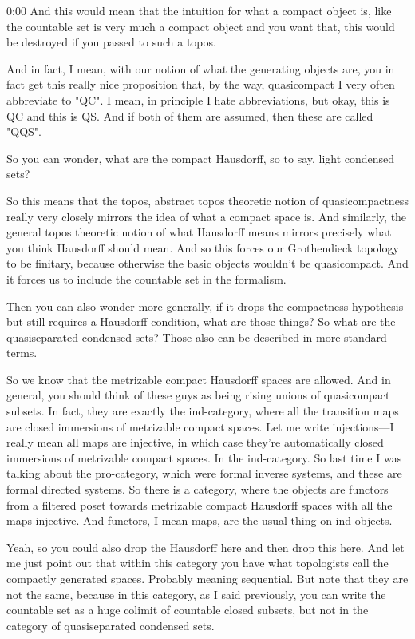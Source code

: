 \begin{unfinished}{0:00}
And this would mean that the intuition for what a compact object is, like the countable set is very much a compact object and you want that, this would be destroyed if you passed to such a topos.

And in fact, I mean, with our notion of what the generating objects are, you in fact get this really nice proposition that, by the way, quasicompact I very often abbreviate to "QC". I mean, in principle I hate abbreviations, but okay, this is QC and this is QS. And if both of them are assumed, then these are called "QQS".

So you can wonder, what are the compact Hausdorff, so to say, light condensed sets?

So this means that the topos, abstract topos theoretic notion of quasicompactness really very closely mirrors the idea of what a compact space is. And similarly, the general topos theoretic notion of what Hausdorff means mirrors precisely what you think Hausdorff should mean. And so this forces our Grothendieck topology to be finitary, because otherwise the basic objects wouldn't be quasicompact. And it forces us to include the countable set in the formalism.

Then you can also wonder more generally, if it drops the compactness hypothesis but still requires a Hausdorff condition, what are those things? So what are the quasiseparated condensed sets? Those also can be described in more standard terms.

So we know that the metrizable compact Hausdorff spaces are allowed. And in general, you should think of these guys as being rising unions of quasicompact subsets. In fact, they are exactly the ind-category, where all the transition maps are closed immersions of metrizable compact spaces. Let me write injections---I really mean all maps are injective, in which case they're automatically closed immersions of metrizable compact spaces. In the ind-category. So last time I was talking about the pro-category, which were formal inverse systems, and these are formal directed systems. So there is a category, where the objects are functors from a filtered poset towards metrizable compact Hausdorff spaces with all the maps injective. And functors, I mean maps, are the usual thing on ind-objects.

Yeah, so you could also drop the Hausdorff here and then drop this here. And let me just point out that within this category you have what topologists call the compactly generated spaces. Probably meaning sequential. But note that they are not the same, because in this category, as I said previously, you can write the countable set as a huge colimit of countable closed subsets, but not in the category of quasiseparated condensed sets.


\end{unfinished}
